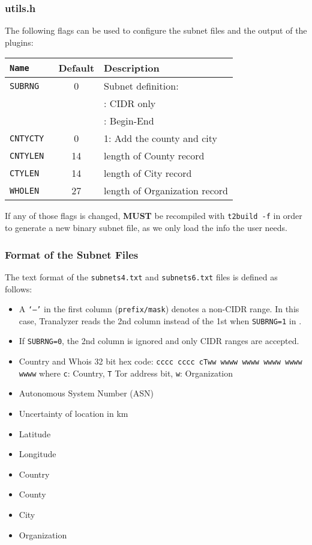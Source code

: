 \subsubsection{utils.h}\label{s:utils.h}
The following flags can be used to configure the subnet files and the output of the plugins:
\begin{longtable}{>{\tt}lcl}
    \toprule
    {\bf Name} & {\bf Default} & {\bf Description}\\
    \midrule\endhead%
    SUBRNG  &  0 & Subnet definition:\\
            &    & \qquad 0: CIDR only\\
            &    & \qquad 1: Begin-End\\
    CNTYCTY &  0 & 1: Add the county and city\\
    CNTYLEN & 14 & length of County record\\
    CTYLEN  & 14 & length of City record\\
    WHOLEN  & 27 & length of Organization record\\
    \bottomrule
\end{longtable}

If any of those flags is changed,  {\bf MUST} be recompiled with {\tt t2build -f} in
order to generate a new binary subnet file, as we only load the info the user needs.

\subsubsection{Format of the Subnet Files}
The text format of the {\tt subnets4.txt} and {\tt subnets6.txt} files is defined as follows:
\begin{itemize}
    \item A {\tt `--'} in the first column ({\tt prefix/mask}) denotes a non-CIDR range.
          In this case, Tranalyzer reads the 2nd column instead of the 1st when {\tt SUBRNG=1} in .
    \item If {\tt SUBRNG=0}, the 2nd column is ignored and only CIDR ranges are accepted.
    \item Country and Whois 32 bit hex code: {\tt cccc cccc cTww wwww wwww wwww wwww wwww} where
          {\tt c}: Country, {\tt T} Tor address bit, {\tt w}: Organization
    \item Autonomous System Number (ASN)
    \item Uncertainty of location in km
    \item Latitude
    \item Longitude
    \item Country
    \item County
    \item City
    \item Organization
\end{itemize}

